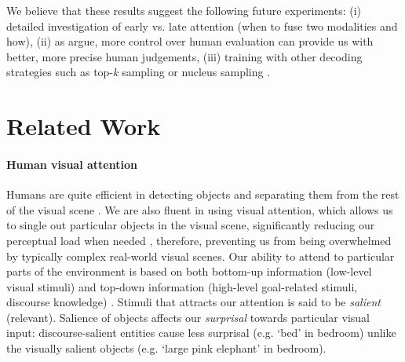 \documentclass[11pt,a4paper]{article}
\begin{document}
We believe that these results suggest the following future experiments: (i) detailed investigation of early vs. late attention (when to fuse two modalities and how), (ii) as  argue, more control over human evaluation can provide us with better, more precise human judgements, (iii) training with other decoding strategies such as top-\textit{k} sampling or nucleus sampling \cite{Holtzman2019}.



\section{Related Work}

\iffalse
\paragraph{Human visual attention}
Humans are quite efficient in detecting objects and separating them from the rest of the visual scene \cite{Ullman87}.
We are also fluent in using visual attention, which allows us to single out particular objects in the visual scene, significantly reducing our perceptual load when needed \cite{Lavie04}, therefore, preventing us from being overwhelmed by typically complex real-world visual scenes.
Our ability to attend to particular parts of the environment is based on both bottom-up information (low-level visual stimuli) and top-down information (high-level goal-related stimuli, discourse knowledge) \cite{Zarcone2016}. %
Stimuli that attracts our attention is said to be \textit{salient} (relevant). Salience of objects affects our \textit{surprisal} towards particular visual input: discourse-salient entities cause less surprisal (e.g. `bed' in bedroom) unlike the visually salient objects (e.g. `large pink elephant' in bedroom).
\end{document}
